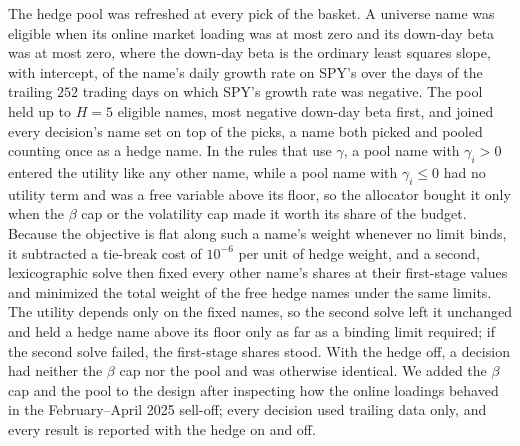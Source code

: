 The hedge pool was refreshed at every pick of the basket. A universe name was eligible when its online market loading
was at most zero and its down-day beta was at most zero, where the down-day beta is the ordinary least squares slope,
with intercept, of the name's daily growth rate on SPY's over the days of the trailing $252$ trading days on which
SPY's growth rate was negative. The pool held up to $H = 5$ eligible names, most negative down-day beta first, and
joined every decision's name set on top of the picks, a name both picked and pooled counting once as a hedge name.
In the rules that use $\gamma$, a pool name with $\gamma_i > 0$ entered the utility like any other name, while a pool
name with $\gamma_i \le 0$ had no utility term and was a free variable above its floor, so the allocator bought it only
when the $\beta$ cap or the volatility cap made it worth its share of the budget. Because the objective is flat along
such a name's weight whenever no limit binds, it subtracted a tie-break cost of $10^{-6}$ per unit of hedge weight,
and a second, lexicographic solve then fixed every other name's shares at their first-stage values and minimized the
total weight of the free hedge names under the same limits. The utility depends only on the fixed names, so the
second solve left it unchanged and held a hedge name above its floor only as far as a binding limit required; if the
second solve failed, the first-stage shares stood. With the hedge off, a decision had neither the $\beta$ cap nor the
pool and was otherwise identical. We added the $\beta$ cap and the pool to the design after inspecting how the online
loadings behaved in the February--April 2025 sell-off; every decision used trailing data only, and every result is
reported with the hedge on and off.


